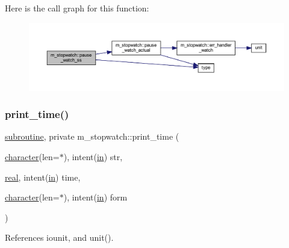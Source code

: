 Here is the call graph for this function\+:
\nopagebreak
\begin{figure}[H]
\begin{center}
\leavevmode
\includegraphics[width=350pt]{namespacem__stopwatch_afb410e70a5b4002d5028e0a284393959_cgraph}
\end{center}
\end{figure}
\mbox{\label{namespacem__stopwatch_a53db4833863b567afa71540bd9aad8f5}} 
\subsubsection{\texorpdfstring{print\+\_\+time()}{print\_time()}}
{\footnotesize\ttfamily \hyperlink{M__stopwatch_83_8txt_acfbcff50169d691ff02d4a123ed70482}{subroutine}, private m\+\_\+stopwatch\+::print\+\_\+time (\begin{DoxyParamCaption}\item[{\hyperlink{option__stopwatch_83_8txt_abd4b21fbbd175834027b5224bfe97e66}{character}(len=$\ast$), intent(\hyperlink{M__journal_83_8txt_afce72651d1eed785a2132bee863b2f38}{in})}]{str,  }\item[{\hyperlink{read__watch_83_8txt_abdb62bde002f38ef75f810d3a905a823}{real}, intent(\hyperlink{M__journal_83_8txt_afce72651d1eed785a2132bee863b2f38}{in})}]{time,  }\item[{\hyperlink{option__stopwatch_83_8txt_abd4b21fbbd175834027b5224bfe97e66}{character}(len=$\ast$), intent(\hyperlink{M__journal_83_8txt_afce72651d1eed785a2132bee863b2f38}{in})}]{form }\end{DoxyParamCaption})\hspace{0.3cm}{\ttfamily [private]}}



References iounit, and unit().

